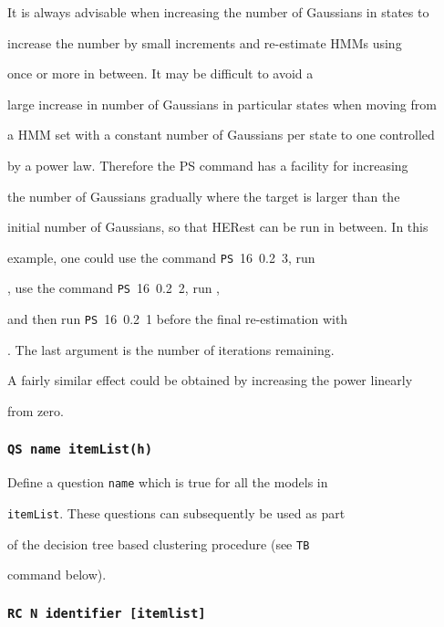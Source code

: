 It is always advisable when increasing the number of Gaussians in states to


increase the number by small increments and re-estimate HMMs using


 once or more in between.  It may be difficult to avoid a


large increase in number of Gaussians in particular states when moving from


a HMM set with a constant number of Gaussians per state to one controlled


by a power law.  Therefore the PS command has a facility for increasing


the number of Gaussians gradually where the target is larger than the


initial number of Gaussians, so that HERest can be run in between.  In this


example, one could use the  command \texttt{PS}~16~0.2~3, run


, use the command \texttt{PS}~16~0.2~2, run ,


and then run \texttt{PS}~16~0.2~1 before the final re-estimation with


.  The last argument is the number of iterations remaining.


A fairly similar effect could be obtained by increasing the power linearly


from zero.








\subsubsection*{\tt QS name itemList(h)}





Define a question \texttt{name} which is true for all the models in


\texttt{itemList}.  These questions can subsequently be used as part 


of the decision tree based clustering procedure (see \texttt{TB}


command below).





\subsubsection*{\tt RC N identifier [itemlist]}





